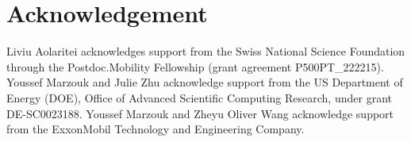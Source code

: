 \documentclass[11pt,a4paper]{article}
\begin{document}
\section*{Acknowledgement}

Liviu Aolaritei acknowledges support from the Swiss National Science Foundation through the Postdoc.Mobility Fellowship (grant agreement P500PT\_222215). Youssef Marzouk and Julie Zhu acknowledge support from the US Department of Energy (DOE), Office of Advanced Scientific Computing Research, under grant DE-SC0023188. Youssef Marzouk and Zheyu Oliver Wang acknowledge support from the ExxonMobil Technology and Engineering Company.






 

\end{document}

